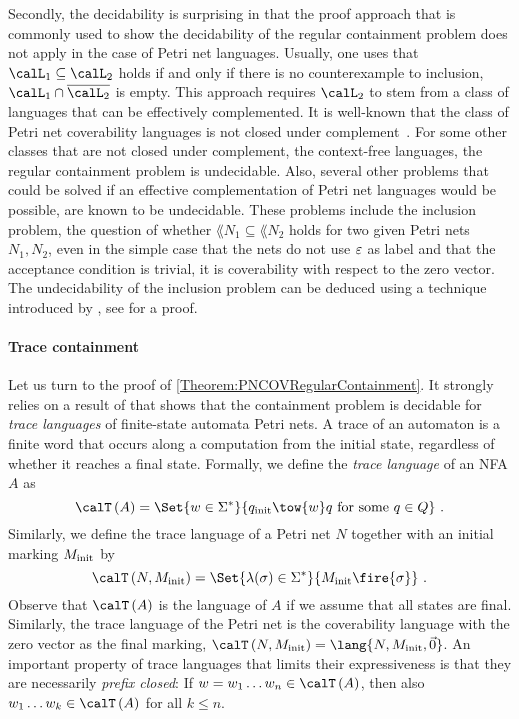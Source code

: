 \documentclass[../../diss.tex]{subfiles}
\begin{document}
Secondly, the decidability is surprising in that the proof approach that is commonly used to show the decidability of the regular containment problem does not apply in the case of Petri net languages.
Usually, one uses that $\calL_1 \subseteq \calL_2$ holds if and only if there is no counterexample to inclusion, \ie $\calL_1 \cap \overline{\calL_2}$ is empty.
This approach requires $\calL_2$ to stem from a class of languages that can be effectively complemented.
It is well-known that the class of Petri net coverability languages is not closed under complement~\cite{MukundKRS98,MukundKRS98b}.
For some other classes that are not closed under complement, \eg the context-free languages, the regular containment problem is undecidable.
Also, several other problems that could be solved if an effective complementation of Petri net languages would be possible, are known to be undecidable.
These problems include the inclusion problem, \ie the question of whether $\lang{N_1} \subseteq \lang{N_2}$ holds for two given Petri nets $N_1, N_2$, even in the simple case that the nets do not use $\varepsilon$ as label and that the acceptance condition is trivial, \ie it is coverability with respect to the zero vector.
The undecidability of the inclusion problem can be deduced using a technique introduced by , see \eg \cite{Wimmel08} for a proof.

\paragraph{Trace containment}

Let us turn to the proof of \cref{Theorem:PNCOVRegularContainment}.
It strongly relies on a result of  that shows that the containment problem is decidable for \emph{trace languages} of finite-state automata \resp Petri nets.
A trace of an automaton is a finite word that occurs along a computation from the initial state, regardless of whether it reaches a final state.
Formally, we define the \emph{trace language} of an NFA $A$ as
\[
     \Traces{A} = \Set{ w \in \Sigma^* }{ q_\init \tow{w} q \text{ for some } q \in Q }
     \ .
\]
Similarly, we define the trace language of a Petri net $N$ together with an initial marking $M_{\text{init}}$ by
\[
    \Traces{N,\Minit} = \Set{ \lambda(\sigma) \in \Sigma^*}{
                \Minit \fire{\sigma}
        }
    \ .
\]
Observe that $\Traces{A}$ is the language of $A$ if we assume that all states are final.
Similarly, the trace language of the Petri net is the coverability language with the zero vector as the final marking, $\Traces{N,\Minit} = \lang{N,\Minit,\vec{0}}$.
An important property of trace languages that limits their expressiveness is that they are necessarily \emph{prefix closed}: If $w = w_1 \ldots w_n \in \Traces{A}$, then also $w_1 \ldots w_k \in \Traces{A}$ for all $k \leq n$.
\end{document}
